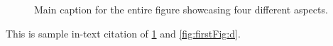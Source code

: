\begin{refsection}
\begin{figure}[H]
	\caption{Main caption for the entire figure showcasing four different aspects.}
	\label{fig:subsubfigwithlabel}
\end{figure}


This is sample in-text citation of \ref{fig:subsubfigwithlabel} and \ref{fig:firstFig:d}.



\clearpage

\printbibliography[heading=subbibintoc, title={\texorpdfstring{\centering}{} Notes}]
\end{refsection}